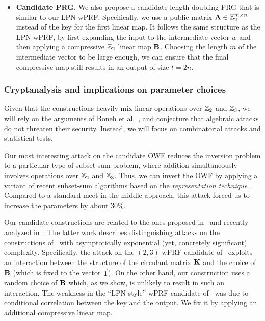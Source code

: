 \begin{itemize}
    \item \textbf{Candidate PRG.}
    We also propose a candidate length-doubling PRG that is similar to our LPN-wPRF. Specifically, we use a public matrix $\mat{A} \in \Z_2^{m \times n}$ instead of the key for the first linear map. It follows the same structure as the LPN-wPRF, by first expanding the input to the intermediate vector $w$ and then applying a compressive $\mathbb{Z}_2$ linear map $\mat{B}$. Choosing the length $m$ of the intermediate vector to be large enough, we can ensure that the final compressive map still results in an output of size $t = 2n$.
\end{itemize}

\subsubsection{Cryptanalysis and implications on parameter choices}

Given that the constructions heavily mix linear operations over $\mathbb{Z}_2$ and $\mathbb{Z}_3$, we will rely on the arguments of Boneh et al.~\cite{boneh2018-darkmatter}, and conjecture that algebraic attacks do not threaten their security. Instead, we will focus on combinatorial attacks and statistical tests.

Our most interesting attack on the candidate OWF reduces the inversion problem to a particular type of subset-sum problem, where addition simultaneously involves operations over $\mathbb{Z}_2$ and $\mathbb{Z}_3$. Thus, we can invert the OWF by applying a variant of recent subset-sum algorithms based on the \emph{representation technique}~\cite{Howgrave-GrahamJ10,BeckerCJ11,BonnetainBSS20}. Compared to a standard meet-in-the-middle approach, this attack forced us to increase the parameters by about $30\%$.

Our candidate constructions are related to the ones proposed in~\cite{boneh2018-darkmatter} and recently analyzed in~\cite{cheon2020-adventures}. The latter work describes distinguishing attacks on the constructions of~\cite{boneh2018-darkmatter} with asymptotically exponential (yet, concretely significant) complexity. Specifically, the attack on the $(2,3)$-wPRF candidate of~\cite{boneh2018-darkmatter} exploits an interaction between the structure of the circulant matrix $\mat{K}$ and the choice of $\mat{B}$ (which is fixed to the vector $\vec{\textbf{1}}$). On the other hand, our construction uses a random choice of $\mat{B}$ which, as we show, is unlikely to result in such an interaction. The weakness in the ``LPN-style'' wPRF candidate of~\cite{boneh2018-darkmatter} was due to conditional correlation between the key and the output. We fix it by applying an additional compressive linear map.

